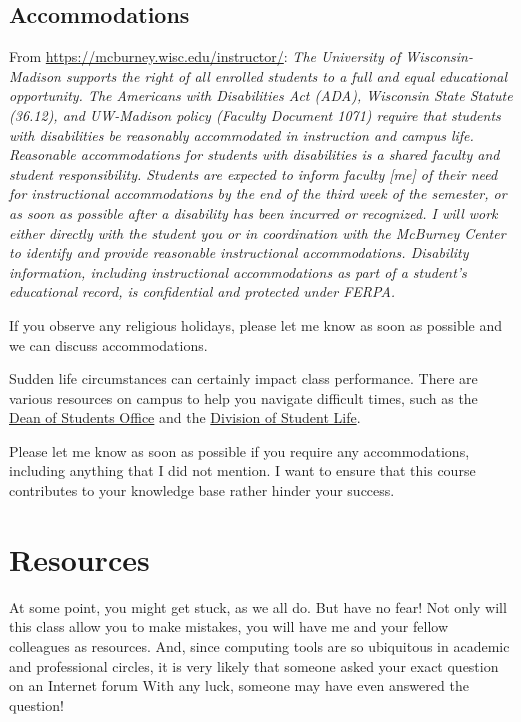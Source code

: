 \documentclass[11pt,]{article}
\begin{document}
\hypertarget{accommodations}{%
\subsection{Accommodations}\label{accommodations}}

From \url{https://mcburney.wisc.edu/instructor/}: \emph{The University
of Wisconsin-Madison supports the right of all enrolled students to a
full and equal educational opportunity. The Americans with Disabilities
Act (ADA), Wisconsin State Statute (36.12), and UW-Madison policy
(Faculty Document 1071) require that students with disabilities be
reasonably accommodated in instruction and campus life. Reasonable
accommodations for students with disabilities is a shared faculty and
student responsibility. Students are expected to inform faculty {[}me{]}
of their need for instructional accommodations by the end of the third
week of the semester, or as soon as possible after a disability has been
incurred or recognized. I will work either directly with the student you
or in coordination with the McBurney Center to identify and provide
reasonable instructional accommodations. Disability information,
including instructional accommodations as part of a student's
educational record, is confidential and protected under FERPA.}

If you observe any religious holidays, please let me know as soon as
possible and we can discuss accommodations.

Sudden life circumstances can certainly impact class performance. There
are various resources on campus to help you navigate difficult times,
such as the \href{https://doso.students.wisc.edu/}{Dean of Students
Office} and the \href{https://students.wisc.edu/}{Division of Student
Life}.

Please let me know as soon as possible if you require any
accommodations, including anything that I did not mention. I want to
ensure that this course contributes to your knowledge base rather hinder
your success.

\hypertarget{resources}{%
\section{Resources}\label{resources}}

At some point, you might get stuck, as we all do. But have no fear! Not
only will this class allow you to make mistakes, you will have me and
your fellow colleagues as resources. And, since computing tools are so
ubiquitous in academic and professional circles, it is very likely that
someone asked your exact question on an Internet forum With any luck,
someone may have even answered the question!
\end{document}
